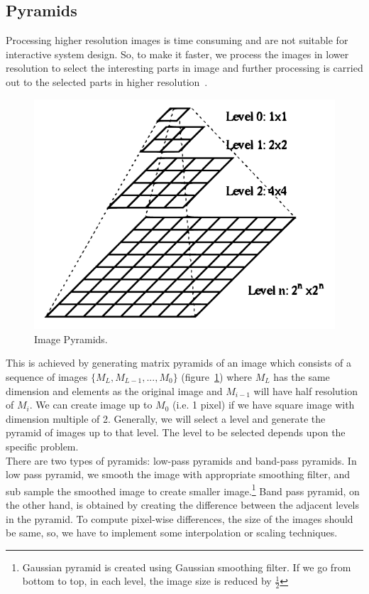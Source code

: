 \subsection{Pyramids}
\label{subsec:pyramids}
Processing higher resolution images is time consuming and are not suitable for interactive system design. So, to make it faster, we process the images in lower resolution to select the interesting parts in image and further processing is carried out to the selected parts in higher resolution~\cite{Sonka:08}.
\begin{figure}[!tb]
\begin{center}
\includegraphics[width=1\textwidth]{2.mainmatter/1.Introduction/figures/Image_Pyramid}%
\caption[Image Pyramids]{Image Pyramids. }%
\label{fig:pyramids}%
\end{center}
\end{figure}
This is achieved by generating matrix pyramids of an image which consists of a sequence of images $\{M_L,M_{L-1},...,M_0\}$ (figure~\ref{fig:pyramids}) where $M_L$ has the same dimension and elements as the original image and $M_{i-1}$  will have half resolution of $M_i$. We can create image up to $M_0$ (i.e. 1 pixel) if we have square image with dimension multiple of 2. Generally, we will select a level and generate the pyramid of images up to that level. The level to be selected depends upon the specific problem.\\

\noindent There are two types of pyramids: low-pass pyramids and band-pass pyramids. In low pass pyramid, we smooth the image with appropriate smoothing filter, and sub sample the smoothed image to create smaller image.\footnote{Gaussian pyramid is created using Gaussian smoothing filter. If we go from bottom to top, in each level, the image size is reduced by $\frac{1}{2}$} Band pass pyramid, on the other hand, is obtained by creating the difference between the adjacent levels in the pyramid. To compute pixel-wise differences, the size of the images should be same, so, we have to implement some interpolation or scaling techniques.



